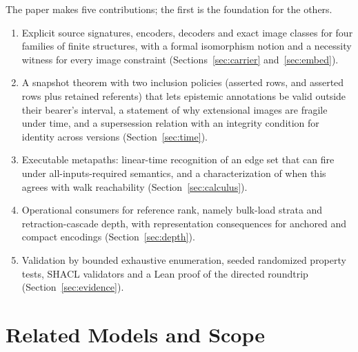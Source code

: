 \documentclass[11pt]{article}
\theoremstyle{plain}
\theoremstyle{definition}
\theoremstyle{remark}
\begin{document}
The paper makes five contributions; the first is the foundation for the others.
\begin{enumerate}
\item Explicit source signatures, encoders, decoders and exact image classes for four
families of finite structures, with a formal isomorphism notion and a necessity
witness for every image constraint (Sections~\ref{sec:carrier} and~\ref{sec:embed}).
\item A snapshot theorem with two inclusion policies (asserted rows, and asserted rows
plus retained referents) that lets epistemic annotations be valid outside their
bearer's interval, a statement of why extensional images are fragile under time, and a
supersession relation with an integrity condition for identity across versions
(Section~\ref{sec:time}).
\item Executable metapaths: linear-time recognition of an edge set that can fire under
all-inputs-required semantics, and a characterization of when this agrees with walk
reachability (Section~\ref{sec:calculus}).
\item Operational consumers for reference rank, namely bulk-load strata and
retraction-cascade depth, with representation consequences for anchored and compact
encodings (Section~\ref{sec:depth}).
\item Validation by bounded exhaustive enumeration, seeded randomized property tests,
SHACL validators and a Lean proof of the directed roundtrip
(Section~\ref{sec:evidence}).
\end{enumerate}

\section{Related Models and Scope}\label{sec:background}
\end{document}
